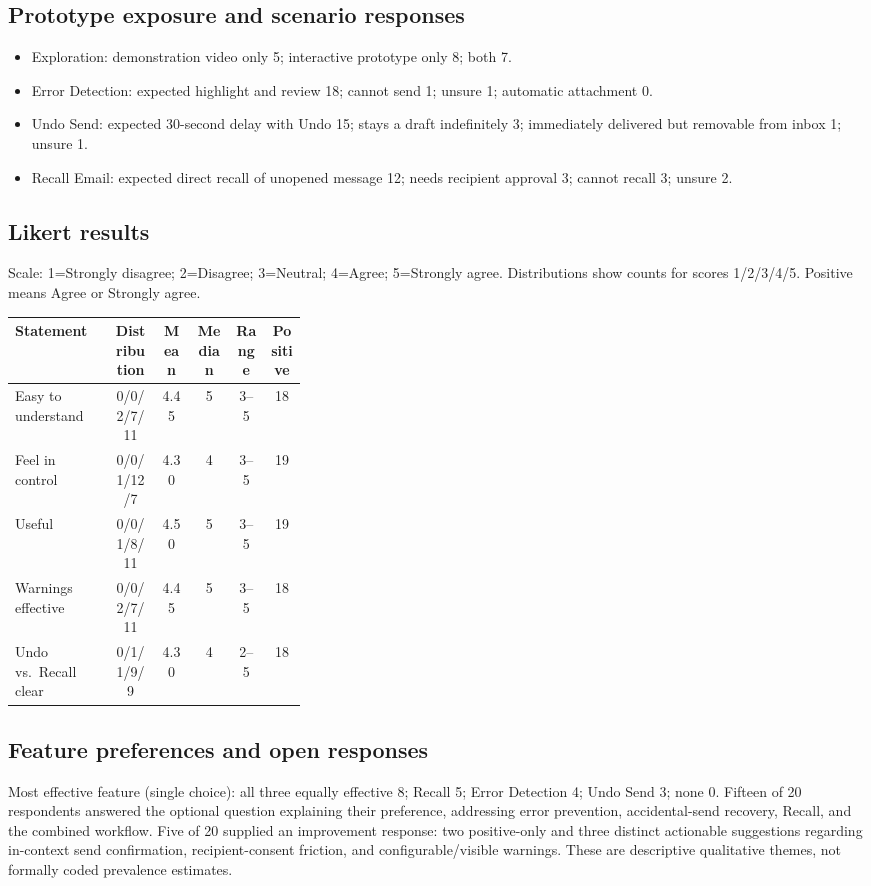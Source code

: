 \documentclass[letterpaper]{jdf}
\begin{document}
\subsection*{Prototype exposure and scenario responses}
\begin{itemize}
\item Exploration: demonstration video only 5; interactive prototype only 8; both 7.
\item Error Detection: expected highlight and review 18; cannot send 1; unsure 1; automatic attachment 0.
\item Undo Send: expected 30-second delay with Undo 15; stays a draft indefinitely 3; immediately delivered but removable from inbox 1; unsure 1.
\item Recall Email: expected direct recall of unopened message 12; needs recipient approval 3; cannot recall 3; unsure 2.
\end{itemize}

\subsection*{Likert results}
Scale: 1=Strongly disagree; 2=Disagree; 3=Neutral; 4=Agree; 5=Strongly agree. Distributions show counts for scores 1/2/3/4/5. Positive means Agree or Strongly agree.
\begin{center}\small
\begin{tabular}{p{0.34\linewidth}ccccc}\hline
Statement & Distribution & Mean & Median & Range & Positive \\ \hline
Easy to understand & 0/0/2/7/11 & 4.45 & 5 & 3--5 & 18 \\
Feel in control & 0/0/1/12/7 & 4.30 & 4 & 3--5 & 19 \\
Useful & 0/0/1/8/11 & 4.50 & 5 & 3--5 & 19 \\
Warnings effective & 0/0/2/7/11 & 4.45 & 5 & 3--5 & 18 \\
Undo vs.\ Recall clear & 0/1/1/9/9 & 4.30 & 4 & 2--5 & 18 \\ \hline
\end{tabular}
\end{center}

\subsection*{Feature preferences and open responses}
Most effective feature (single choice): all three equally effective 8; Recall 5; Error Detection 4; Undo Send 3; none 0. Fifteen of 20 respondents answered the optional question explaining their preference, addressing error prevention, accidental-send recovery, Recall, and the combined workflow. Five of 20 supplied an improvement response: two positive-only and three distinct actionable suggestions regarding in-context send confirmation, recipient-consent friction, and configurable/visible warnings. These are descriptive qualitative themes, not formally coded prevalence estimates.
\end{document}
